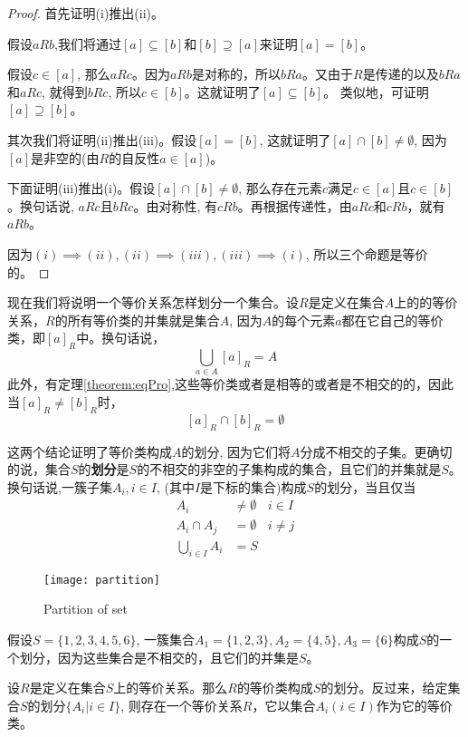 \begin{proof}
	首先证明(i)推出(ii)。
	
	假设$aRb$,我们将通过$[a]\subseteq [b]$和$[b]\supseteq [a]$来证明$[a]=[b]$。
	
	假设$c\in [a]$, 那么$aRc$。因为$aRb$是对称的，所以$bRa$。又由于$R$是传递的以及$bRa$和$aRc$, 就得到$bRc$, 所以$c\in [b]$。这就证明了$[a]\subseteq [b]$。 类似地，可证明$[a]\supseteq [b]$。
	
	其次我们将证明(ii)推出(iii)。假设$[a]=[b]$, 这就证明了$[a]\cap [b]\ne\emptyset$, 因为$[a]$是非空的(由$R$的自反性$a\in [a]$)。
	
	下面证明(iii)推出(i)。假设$[a]\cap [b]\ne\emptyset$, 那么存在元素$c$满足$c\in [a]$且$c\in [b]$。换句话说, $aRc$且$bRc$。由对称性, 有$cRb$。再根据传递性，由$aRc$和$cRb$，就有$aRb$。
	
	因为$(i)\implies (ii),(ii)\implies (iii),(iii)\implies (i)$, 所以三个命题是等价的。
\end{proof}

现在我们将说明一个等价关系怎样划分一个集合。设$R$是定义在集合$A$上的的等价关系，$R$的所有等价类的并集就是集合$A$, 因为$A$的每个元素$a$都在它自己的等价类，即$[a]_R$中。换句话说，
\[ \bigcup_{a\in A}[a]_R = A \]
此外，有定理\ref{theorem:eqPro},这些等价类或者是相等的或者是不相交的的，因此当$[a]_R\ne[b]_R$时，
\[ [a]_R\cap [b]_R = \emptyset\]

这两个结论证明了等价类构成$A$的划分, 因为它们将$A$分成不相交的子集。更确切的说，集合$S$的\textbf{划分}是$S$的不相交的非空的子集构成的集合，且它们的并集就是$S$。换句话说,一簇子集$A_i,i\in I$, (其中$I$是下标的集合)构成$S$的划分，当且仅当
\begin{align*}
A_i &\ne \emptyset  &i\in I \\
A_i\cap A_j &=\emptyset  &i\ne j\\
\bigcup_{i\in I}A_i &= S  &
\end{align*}

\begin{figure}[htbp]
	\texttt{[image: partition]}
	\caption{Partition of set}
	\label{fig:partition}
\end{figure}

\begin{example}
	假设$S=\{1,2,3,4,5,6\}$, 一簇集合$A_1=\{1,2,3\},A_2=\{4,5\},A_3=\{6\}$构成$S$的一个划分，因为这些集合是不相交的，且它们的并集是$S$。
\end{example}

\begin{theorem}
	设$R$是定义在集合$S$上的等价关系。那么$R$的等价类构成$S$的划分。反过来，给定集合$S$的划分$\{A_i|i\in I\}$, 则存在一个等价关系$R$，它以集合$A_i(i\in I)$作为它的等价类。
\end{theorem}

